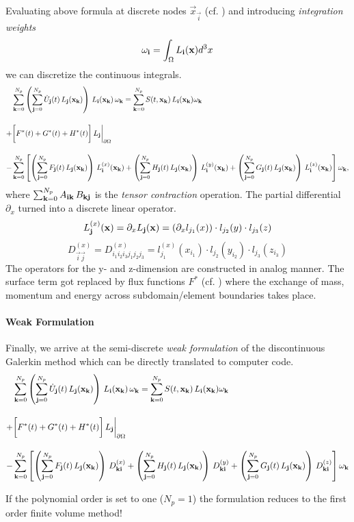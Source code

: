 \newcommand{\LXIK}{L^{(x)}_{\vec{i}}(\vec{x}_{\vec{k}})}
\newcommand{\LYIK}{L^{(y)}_{\vec{i}}(\vec{x}_{\vec{k}})}
\newcommand{\LZIK}{L^{(z)}_{\vec{i}}(\vec{x}_{\vec{k}})}

Evaluating above formula at discrete nodes $\vec{x}_{\vec{i}}$ (cf.
) and introducing \emph{integration weights}
\begin{equation}
\label{eqn:mass-matrix}
    \omega_{\mathbf{i}} = \int_{\Omega} L_{\mathbf{i}}(\mathbf{x}) d^3 x
\end{equation}
we can discretize the continuous integrals.
\begin{align}
     &\sumK \left(\sumJ \UJ \, \LJK \right) \, \LIK \,\wK = \sumK \STXK \, \LIK \wK \nonumber \br
    +&\bigg[ F^*(t) + G^*(t) + H^*(t)\bigg] \, L_{\vec{j}}\bigg|_{\partial\Omega} \br
    -&\sumK \left[
          \left(\sumJ \FJ \, \LJK \right) \, \LXIK 
        + \left(\sumJ \HJ \, \LJK \right) \, \LYIK
        + \left(\sumJ \GJ \, \LJK \right) \, \LZIK \right] \wK, \nonumber
\end{align}
where $\sum^{N_p}_{\mathbf{k}=0} A_{\mathbf{i}\mathbf{k}} \, B_{\mathbf{k}\mathbf{j}}$ is the \emph{tensor
contraction} operation.  The partial differential
$\partial_x$ turned into a discrete linear operator.
\newcommand{\DXKI}{D^{(x)}_{\vec{k}\vec{i}}}
\newcommand{\DYKI}{D^{(y)}_{\vec{k}\vec{i}}}
\newcommand{\DZKI}{D^{(z)}_{\vec{k}\vec{i}}}
\begin{equation}
    L^{(x)}_{\mathbf{j}}(\mathbf{x}) = \partial_x L_{\mathbf{j}}(\mathbf{x}) = (\partial_x l_{j_1}(x)) \cdot l_{j_2}(y) \cdot l_{j_3}(z)
\end{equation}
\begin{equation}
    D^{(x)}_{\vec{i}\vec{j}} = D^{(x)}_{i_1i_2i_3j_1j_2j_3} = l^{(x)}_{j_1}(x_{i_1})\cdot l_{j_2}(y_{i_2}) \cdot l_{j_3}(z_{i_3})
\end{equation}
The operators for the y- and z-dimension are constructed in analog manner.  The
surface term got replaced by flux functions $F^*$ (cf. )
where the exchange of mass, momentum and energy across subdomain/element
boundaries takes place.

\paragraph{Weak Formulation}
Finally, we arrive at the semi-discrete \emph{weak formulation} of the
discontinuous Galerkin method which can be directly translated to computer
code.
\begin{align}
\label{eqn:semi-discrete-weak-formulation}
     &\sumK \left(\sumJ \UJ \, \LJK \right) \, \LIK \,\wK = \sumK \STXK \, \LIK \wK \nonumber \br
    +&\bigg[ F^*(t) + G^*(t) + H^*(t)\bigg]\, L_{\vec{j}}\bigg|_{\partial\Omega} \br
    -&\sumK \left[
          \left(\sumJ \FJ \, \LJK \right) \, \DXKI 
        + \left(\sumJ \HJ \, \LJK \right) \, \DYKI
        + \left(\sumJ \GJ \, \LJK \right) \, \DZKI \right] \wK \nonumber
\end{align}

\remark If the polynomial order is set to one ($N_p = 1$) the formulation reduces
to the first order finite volume method!
